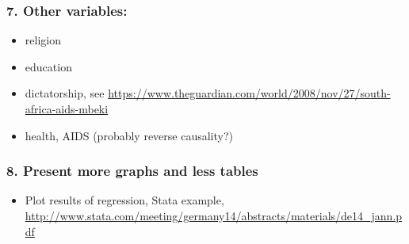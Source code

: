 \documentclass[english,]{article}
\providecommand{\tightlist}{%
  \setlength{\itemsep}{0pt}\setlength{\parskip}{0pt}}
\begin{document}
\subsubsection{7. Other variables:}\label{other-variables}

\begin{itemize}
\tightlist
\item
  religion
\item
  education
\item
  dictatorship, see
  \url{https://www.theguardian.com/world/2008/nov/27/south-africa-aids-mbeki}
\item
  health, AIDS (probably reverse causality?)
\end{itemize}

\subsubsection{8. Present more graphs and less
tables}\label{present-more-graphs-and-less-tables}

\begin{itemize}
\tightlist
\item
  Plot results of regression, Stata example,
  \url{http://www.stata.com/meeting/germany14/abstracts/materials/de14_jann.pdf}
\end{itemize}
\end{document}
